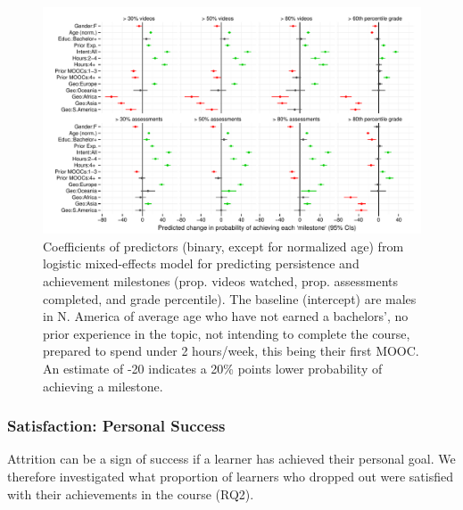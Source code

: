 \documentclass{sigchi}\usepackage[]{graphicx}\usepackage[]{color}
\makeatletter
\def\maxwidth{ %
  \ifdim\Gin@nat@width>\linewidth
    \linewidth
  \else
    \Gin@nat@width
  \fi
}
\newenvironment{knitrout}{}{} %
\makeatother
\begin{document}
\begin{knitrout}
\color{fgcolor}\begin{figure}[ht]

\includegraphics[width=\maxwidth]{figure/s1coefs} \caption[Coefficients of predictors (binary, except for normalized age) from logistic mixed-effects model for predicting persistence and achievement milestones (prop]{Coefficients of predictors (binary, except for normalized age) from logistic mixed-effects model for predicting persistence and achievement milestones (prop. videos watched, prop. assessments completed, and grade percentile). The baseline (intercept) are males in N. America of average age who have not earned a bachelors', no prior experience in the topic, not intending to complete the course, prepared to spend under 2 hours/week, this being their first MOOC. An estimate of -20 indicates a 20\% points lower probability of achieving a milestone.\label{fig:s1coefs}}
\end{figure}


\end{knitrout}

\subsubsection{Satisfaction: Personal Success}

Attrition can be a sign of success if a learner has achieved their personal goal. We therefore investigated what proportion of learners who dropped out were satisfied with their achievements in the course (RQ2).
\end{document}

